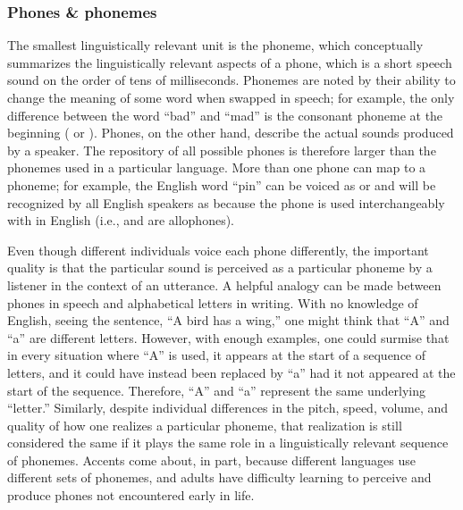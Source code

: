 
\subsubsection{Phones \& phonemes}

The smallest linguistically relevant unit
is the phoneme, which conceptually
summarizes the linguistically relevant
aspects of a phone,
which is a short speech sound
on the order of tens of milliseconds.
Phonemes are noted by their ability
to change the meaning of some word
when swapped in speech;
for example, the only difference between
the word ``bad'' and ``mad'' is the
consonant phoneme
at the beginning
( or ).
Phones, on the other hand,
describe the actual sounds
produced by a speaker.
The repository of all possible phones
is therefore larger than the phonemes
used in a particular language.
More than one phone can map
to a phoneme;
for example, the English word
``pin'' can be voiced as
\ipa{[pIn]} or \ipa{[p\super{h}In]}
and will be recognized by
all English speakers
as  because
the \ipa{[p\super{h}]} phone
is used interchangeably with
\ipa{[p]} in English
(i.e., \ipa{[p\super{h}]} and \ipa{[p]}
are allophones).

Even though different individuals
voice each phone differently,
the important quality is that
the particular sound is perceived
as a particular phoneme
by a listener
in the context of an utterance.
A helpful analogy can be made between
phones in speech
and alphabetical letters in writing.
With no knowledge of English,
seeing the sentence,
``A bird has a wing,''
one might think that ``A'' and ``a''
are different letters.
However, with enough examples,
one could surmise that in every situation
where ``A'' is used, it appears at the
start of a sequence of letters,
and it could have instead
been replaced by ``a''
had it not appeared at the start of the sequence.
Therefore, ``A'' and ``a'' represent
the same underlying ``letter.''
Similarly, despite individual differences
in the pitch, speed, volume, and quality
of how one realizes a particular phoneme,
that realization is still considered the same
if it plays the same role
in a linguistically relevant sequence of phonemes.
Accents come about, in part,
because different languages use different
sets of phonemes,
and adults have difficulty
learning to perceive and produce
phones not encountered early in life.

